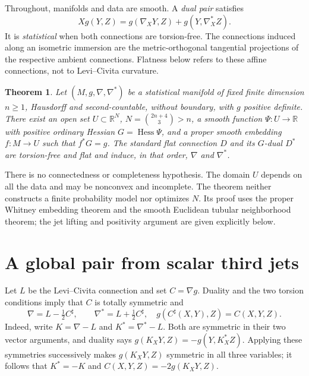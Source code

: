 \documentclass[10pt,letterpaper]{article}
\newtheorem{theorem}{Theorem}
\newcommand{\R}{\mathbb R}
\newcommand{\Hess}{\operatorname{Hess}}
\begin{document}
Throughout, manifolds and data are smooth. A \emph{dual pair} satisfies
\begin{equation}\label{eq:duality}
 Xg(Y,Z)=g(\nabla_XY,Z)+g(Y,\nabla^*_XZ).
\end{equation}
It is \emph{statistical} when both connections are torsion-free. The
connections induced along an isometric immersion are the metric-orthogonal
tangential projections of the respective ambient connections. Flatness below
refers to these affine connections, not to Levi--Civita curvature.

\begin{theorem}\label{thm:main}
Let $(M,g,\nabla,\nabla^*)$ be a statistical manifold of fixed finite
dimension $n\geq1$, Hausdorff and second-countable, without boundary, with
$g$ positive definite. There exist an open set $U\subset\R^N$,
$N=\binom{2n+4}{3}>n$, a smooth function $\Psi:U\to\R$ with positive
ordinary Hessian $G=\Hess\Psi$, and a proper smooth embedding $f:M\to U$
such that $f^*G=g$. The standard flat connection $D$ and its $G$-dual $D^*$
are torsion-free and flat and induce, in that order, $\nabla$ and $\nabla^*$.
\end{theorem}

There is no connectedness or completeness hypothesis. The domain $U$ depends
on all the data and may be nonconvex and incomplete. The theorem neither
constructs a finite probability model nor optimizes $N$. Its proof uses the
proper Whitney embedding theorem and the smooth Euclidean tubular
neighborhood theorem; the jet lifting and positivity argument are given
explicitly below.

\section{A global pair from scalar third jets}

Let $L$ be the Levi--Civita connection and set $C=\nabla g$. Duality and
the two torsion conditions imply that $C$ is totally symmetric and
\begin{equation}\label{eq:difference}
 \nabla=L-\tfrac12 C^\sharp,\qquad
 \nabla^*=L+\tfrac12 C^\sharp,
 \quad g(C^\sharp(X,Y),Z)=C(X,Y,Z).
\end{equation}
Indeed, write $K=\nabla-L$ and $K^*=\nabla^*-L$. Both are symmetric in
their two vector arguments, and duality says
$g(K_XY,Z)=-g(Y,K^*_XZ)$. Applying these symmetries successively makes
$g(K_XY,Z)$ symmetric in all three variables; it follows that
$K^*=-K$ and $C(X,Y,Z)=-2g(K_XY,Z)$.
\end{document}
